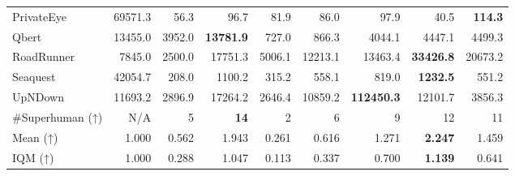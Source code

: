 \begin{table*}[h]
\begin{center}
\begin{small}
{\begin{tabular}{lrr rrrrrr}
PrivateEye           &  69571.3   &  56.3      &  96.7               &  81.9     &  86.0      &  97.9                &  40.5               &  \textbf{114.3}           \\
Qbert                &  13455.0   &  3952.0    &  \textbf{13781.9}   &  727.0    &  866.3     &  4044.1              &  4447.1             &  4499.3                   \\
RoadRunner           &  7845.0    &  2500.0    &  17751.3            &  5006.1   &  12213.1   &  13463.4             &  \textbf{33426.8}   &  20673.2                  \\
Seaquest             &  42054.7   &  208.0     &  1100.2             &  315.2    &  558.1     &  819.0               &  \textbf{1232.5}    &  551.2                    \\
UpNDown              &  11693.2   &  2896.9    &  17264.2            &  2646.4   &  10859.2   &  \textbf{112450.3}   &  12101.7            &  3856.3                   \\
\midrule
\#Superhuman (↑)     &  N/A       &  5         &  \textbf{14}        &  2        &  6         &  9                   &  12                 &  11                       \\
Mean (↑)             &  1.000     &  0.562     &  1.943              &  0.261    &  0.616     &  1.271               &  \textbf{2.247}     &  1.459                    \\
IQM (↑)              &  1.000     &  0.288     &  1.047              &  0.113    &  0.337     &  0.700               &  \textbf{1.139}     &  0.641                    \\

\bottomrule
\end{tabular}
 }
\end{small}
\end{center}
\end{table*}